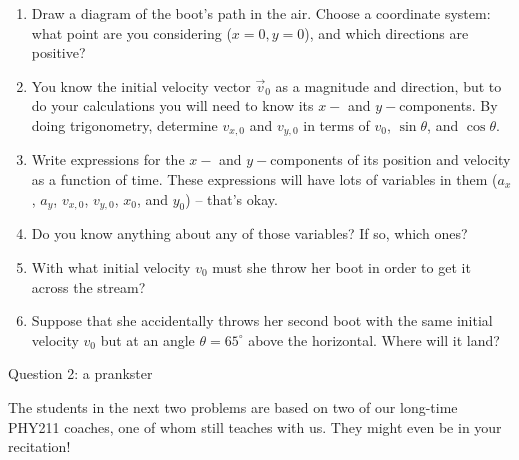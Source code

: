 \documentclass[12pt]{article}
\begin{document}
\begin{enumerate}

\item Draw a diagram of the boot's path in the air. Choose a coordinate system: what point are you considering ($x=0, y=0$), and which directions are positive? 

\vspace{2in}
\newpage
\item You know the initial velocity vector $\vec v_0$ as a magnitude and direction, but to do your calculations you will need to know its $x-$ and $y-$components. By doing trigonometry,
determine $v_{x,0}$ and $v_{y,0}$ in terms of $v_0$, $\sin \theta$, and $\cos \theta$.

\vspace{2in}

\item Write expressions for the $x-$ and $y-$components of its position and velocity as a function of time. These expressions will have lots of variables in them ($a_x$, $a_y$, $v_{x,0}$, $v_{y,0}$, $x_0$, and $y_0$) -- that's okay.

\vspace{2in}

\item Do you know anything about any of those variables? If so, which ones?

\newpage


\item With what initial velocity $v_0$ must she throw her boot in order to get it across the stream?

\vspace{3in}

\item Suppose that she accidentally throws her second boot with the same initial velocity $v_0$ but at an angle $\theta = 65^\circ$ above the horizontal. Where will it land?

\vspace{2in}

\end{enumerate}

\newpage

\centerline{\Large Question 2: a prankster}     

\footnotesize

\it \begin{center} The students in the next two problems are based on two of our long-time PHY211 coaches, one of whom still teaches with us. They might even be in your recitation! \end{center}
\end{document}
